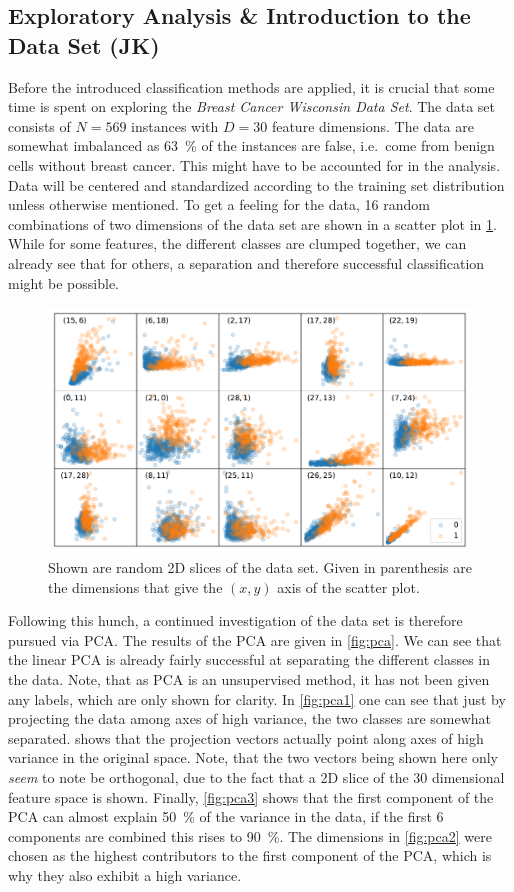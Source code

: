 \documentclass[12pt, a4paper]{scrartcl}
\begin{document}
\subsection{Exploratory Analysis \& Introduction to the Data Set (JK)}
Before the introduced classification methods are applied, it is crucial that some time is spent on exploring the \emph{Breast Cancer Wisconsin Data Set}.
The data set consists of $N=569$ instances with $D=30$ feature dimensions. The data are somewhat imbalanced as \SI{63}{\percent} of the instances are false, i.e.\  come from benign cells without breast cancer. This might have to be accounted for in the analysis.
Data will be centered and standardized according to the training set distribution unless otherwise mentioned.
To get a feeling for the data, 16 random combinations of two dimensions of the data set are shown in a scatter plot in \cref{fig:random_scatter}. While for some features, the different classes are clumped together, we can already see that for others, a separation and therefore successful classification might be possible.
\begin{figure}
	\centering
	\includegraphics[width=\textwidth]{random_scatter}
	\caption{Shown are random 2D slices of the data set. Given in parenthesis are the dimensions that give the $(x,y)$ axis of the scatter plot.}
	\label{fig:random_scatter}
\end{figure}

Following this hunch, a continued investigation of the data set is therefore pursued via PCA.
The results of the PCA are given in \cref{fig:pca}. We can see that the linear PCA is already fairly successful at separating the different classes in the data. Note, that as PCA is an unsupervised method, it has not been given any labels, which are only shown for clarity. In \cref{fig:pca1} one can see that just by projecting the data among axes of high variance, the two classes are somewhat separated.  shows that the projection vectors actually point along axes of high variance in the original space. Note, that the two vectors being shown here only \emph{seem} to note be orthogonal, due to the fact that a 2D slice of the 30 dimensional feature space is shown. Finally, \cref{fig:pca3} shows that the first component of the PCA can almost explain \SI{50}{\percent} of the variance in the data, if the first 6 components are combined this rises to \SI{90}{\percent}. 
The dimensions in \cref{fig:pca2} were chosen as the highest contributors to the first component of the PCA, which is why they also exhibit a high variance.
\end{document}
